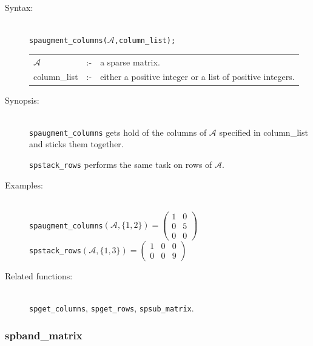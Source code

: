 \begin{description}
\item[Syntax:]\mbox{}\\
{\tt spaugment\_columns($\mathcal{A}$,column\_list);}\\[2mm]
\begin{tabular}{l l l}
$\mathcal{A}$  &:-& a sparse matrix. \\
column\_list &:-&  either a positive integer or a list of positive
                   integers.
\end{tabular}

\item[Synopsis:]\mbox{}\\
\texttt{spaugment\_columns} gets hold of the columns of $\mathcal{A}$ specified
in column\_list and sticks them together.

\texttt{spstack\_rows} performs the same task on rows of
                $\mathcal{A}$.

\item[Examples:]\mbox{}\\
\texttt{spaugment\_columns}\((\mathcal{A},\{1,2\})  =
\begin{pmatrix} 1 & 0 \\ 0 & 5 \\ 0 & 0 \end{pmatrix}\)  \\[2mm]
\texttt{spstack\_rows}\((\mathcal{A},\{1,3\})  =
\begin{pmatrix} 1 & 0 & 0 \\ 0 & 0 & 9 \end{pmatrix}\)

\item[Related functions:]\mbox{}\\
\texttt{spget\_columns}, \texttt{spget\_rows},
\texttt{spsub\_matrix}.
\end{description}

\subsubsection{spband\_matrix}
\label{sparse:spband_matrix}
\hypertarget{operator:SPBAND_MATRIX}{}

